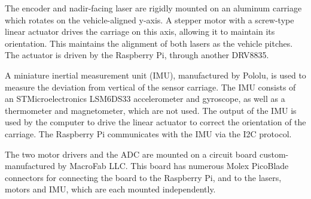 The encoder and nadir-facing laser are rigidly mounted on an aluminum carriage which rotates on the vehicle-aligned y-axis. A stepper motor with a screw-type linear actuator drives the carriage on this axis, allowing it to maintain its orientation. This maintains the alignment of both lasers as the vehicle pitches. The actuator is driven by the Raspberry Pi, through another DRV8835.

A miniature inertial measurement unit (IMU), manufactured by Pololu, is used to measure the deviation from vertical of the sensor carriage. The IMU consists of an STMicroelectronics LSM6DS33 accelerometer and gyroscope, as well as a thermometer and magnetometer, which are not used. The output of the IMU is used by the computer to drive the linear actuator to correct the orientation of the carriage. The Raspberry Pi communicates with the IMU via the I2C protocol.

The two motor drivers and the ADC are mounted on a circuit board custom-manufactured by MacroFab LLC. This board has numerous Molex PicoBlade connectors for connecting the board to the Raspberry Pi, and to the lasers, motors and IMU, which are each mounted independently.





